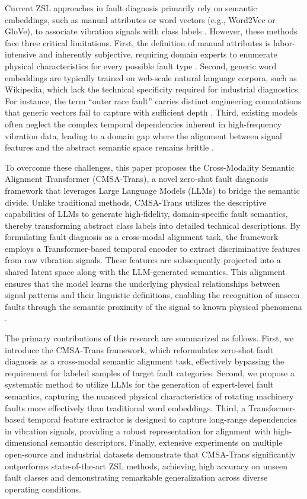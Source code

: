 Current ZSL approaches in fault diagnosis primarily rely on semantic embeddings, such as manual attributes or word vectors (e.g., Word2Vec or GloVe), to associate vibration signals with class labels \cite{lampert2014attribute}. However, these methods face three critical limitations. First, the definition of manual attributes is labor-intensive and inherently subjective, requiring domain experts to enumerate physical characteristics for every possible fault type \cite{fu2018zero}. Second, generic word embeddings are typically trained on web-scale natural language corpora, such as Wikipedia, which lack the technical specificity required for industrial diagnostics. For instance, the term ``outer race fault'' carries distinct engineering connotations that generic vectors fail to capture with sufficient depth \cite{mikolov2013efficient}. Third, existing models often neglect the complex temporal dependencies inherent in high-frequency vibration data, leading to a domain gap where the alignment between signal features and the abstract semantic space remains brittle \cite{xian2018zero, buchert2020zero}.

To overcome these challenges, this paper proposes the Cross-Modality Semantic Alignment Transformer (CMSA-Trans), a novel zero-shot fault diagnosis framework that leverages Large Language Models (LLMs) to bridge the semantic divide. Unlike traditional methods, CMSA-Trans utilizes the descriptive capabilities of LLMs to generate high-fidelity, domain-specific fault semantics, thereby transforming abstract class labels into detailed technical descriptions. By formulating fault diagnosis as a cross-modal alignment task, the framework employs a Transformer-based temporal encoder to extract discriminative features from raw vibration signals. These features are subsequently projected into a shared latent space along with the LLM-generated semantics. This alignment ensures that the model learns the underlying physical relationships between signal patterns and their linguistic definitions, enabling the recognition of unseen faults through the semantic proximity of the signal to known physical phenomena \cite{vaswani2017attention, radford2021learning}.

The primary contributions of this research are summarized as follows. First, we introduce the CMSA-Trans framework, which reformulates zero-shot fault diagnosis as a cross-modal semantic alignment task, effectively bypassing the requirement for labeled samples of target fault categories. Second, we propose a systematic method to utilize LLMs for the generation of expert-level fault semantics, capturing the nuanced physical characteristics of rotating machinery faults more effectively than traditional word embeddings. Third, a Transformer-based temporal feature extractor is designed to capture long-range dependencies in vibration signals, providing a robust representation for alignment with high-dimensional semantic descriptors. Finally, extensive experiments on multiple open-source and industrial datasets demonstrate that CMSA-Trans significantly outperforms state-of-the-art ZSL methods, achieving high accuracy on unseen fault classes and demonstrating remarkable generalization across diverse operating conditions.

